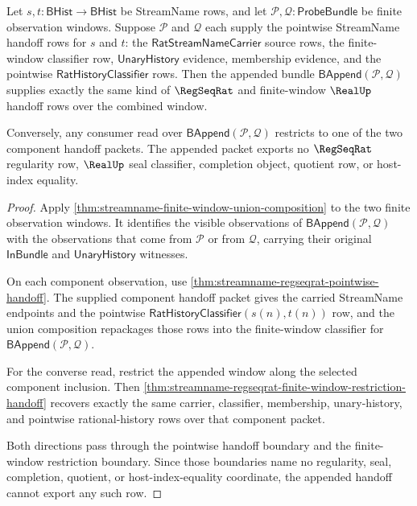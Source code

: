 \begin{theorem}
\label{thm:streamname-regseqrat-bundle-union-handoff}
Let $s,t:\mathsf{BHist}\to\mathsf{BHist}$ be StreamName rows, and let
$\mathcal P,\mathcal Q:\mathsf{ProbeBundle}$ be finite observation windows.
Suppose $\mathcal P$ and $\mathcal Q$ each supply the pointwise StreamName
handoff rows for $s$ and $t$: the $\mathsf{RatStreamNameCarrier}$ source
rows, the finite-window classifier row, $\mathsf{UnaryHistory}$ evidence,
membership evidence, and the pointwise $\mathsf{RatHistoryClassifier}$ rows.
Then the appended bundle $\mathsf{BAppend}(\mathcal P,\mathcal Q)$ supplies
exactly the same kind of $\RegSeqRat$ and finite-window $\RealUp$ handoff
rows over the combined window.

Conversely, any consumer read over
$\mathsf{BAppend}(\mathcal P,\mathcal Q)$ restricts to one of the two
component handoff packets. The appended packet exports no $\RegSeqRat$
regularity row, $\RealUp$ seal classifier, completion object, quotient row,
or host-index equality.
\end{theorem}
\begin{proof}
Apply \autoref{thm:streamname-finite-window-union-composition} to the two
finite observation windows. It identifies the visible observations of
$\mathsf{BAppend}(\mathcal P,\mathcal Q)$ with the observations that come
from $\mathcal P$ or from $\mathcal Q$, carrying their original
$\mathsf{InBundle}$ and $\mathsf{UnaryHistory}$ witnesses.

On each component observation, use
\autoref{thm:streamname-regseqrat-pointwise-handoff}. The supplied component
handoff packet gives the carried StreamName endpoints and the pointwise
$\mathsf{RatHistoryClassifier}(s(n),t(n))$ row, and the union composition
repackages those rows into the finite-window classifier for
$\mathsf{BAppend}(\mathcal P,\mathcal Q)$.

For the converse read, restrict the appended window along the selected
component inclusion. Then
\autoref{thm:streamname-regseqrat-finite-window-restriction-handoff}
recovers exactly the same carrier, classifier, membership, unary-history,
and pointwise rational-history rows over that component packet.

Both directions pass through the pointwise handoff boundary and the
finite-window restriction boundary. Since those boundaries name no
regularity, seal, completion, quotient, or host-index-equality coordinate,
the appended handoff cannot export any such row.
\end{proof}

